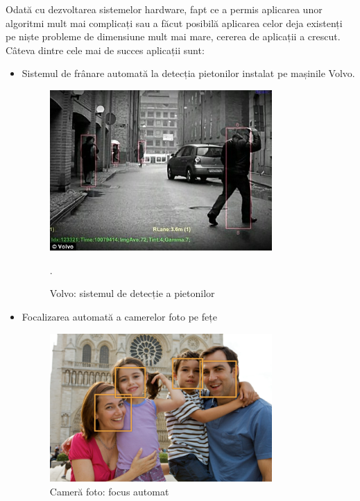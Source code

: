 Odată cu dezvoltarea sistemelor hardware, fapt ce a permis aplicarea unor algoritmi mult mai complicați sau a făcut posibilă aplicarea celor deja existenți pe niște probleme de dimensiune mult mai mare, cererea de aplicații a crescut.
Câteva dintre cele mai de succes aplicații sunt: 
\begin{itemize}
	\item Sistemul de frânare automată la detecția pietonilor instalat pe mașinile Volvo.\cite{volvo}
	\begin{figure}[H]
		\centering
			\includegraphics[width=0.8\textwidth]{imagini/volvo_pedestrian_detection.jpg}
		\caption{Volvo: sistemul de detecție a pietonilor\cite{VolvoArticle}}.
		\label{fig:volvo_pedestrian_detection}
	\end{figure}
	
	\item Focalizarea automată a camerelor foto pe fețe		
	\begin{figure}[H]
		\centering
			\includegraphics[width=0.8\textwidth]{imagini/face_detection_2x.png}
		\caption{Cameră foto: focus automat\cite{CanonFaceRecognition}}
		\label{fig:face_detection_2x}
	\end{figure}
	



\end{itemize}
